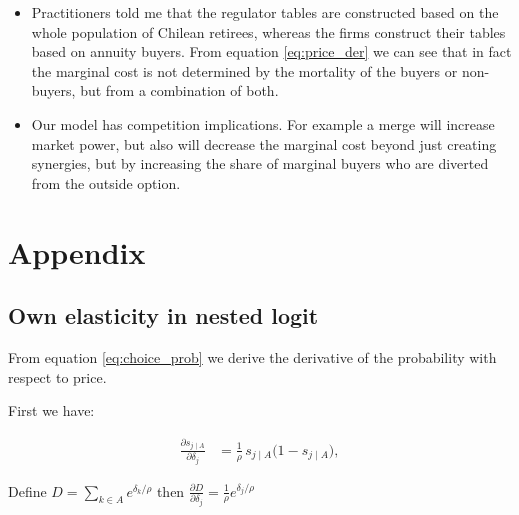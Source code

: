 \documentclass[12pt]{article}
\theoremstyle{plain}
\theoremstyle{plain}
\begin{document}
\begin{itemize}
    \item Practitioners told me that the regulator tables are constructed based on the whole population of Chilean retirees, whereas the firms construct their tables based on annuity buyers. From equation \ref{eq:price_der} we can see that in fact the marginal cost is not determined by the mortality of the buyers or non-buyers, but from a combination of both. 

    \item Our model has competition implications. For example a merge will increase market power, but also will decrease the marginal cost beyond just creating synergies, but by increasing the share of marginal buyers who are diverted from the outside option. 
\end{itemize}


\section{Appendix}

\subsection{Own elasticity in nested logit}\label{sec:appendix1}
From equation \ref{eq:choice_prob} we derive the derivative of the probability with respect to price. 

First we have: 

\begin{align}\label{eq:a1}
\frac{\partial s_{j\mid A}}{\partial \delta_j}
&=\frac{1}{\rho}\,s_{j\mid A}\big(1 - s_{j\mid A}\big), 
\end{align}

Define $D= \sum_{k\in A} e^{\delta_k/\rho}$ then $\frac{\partial D}{\partial \delta_j} =\frac{1}{\rho} e^{\delta_j/\rho} $
\end{document}

